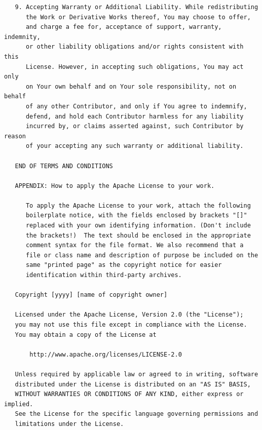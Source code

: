 \documentclass{book}
\begin{document}
\begin{verbatim}
   9. Accepting Warranty or Additional Liability. While redistributing
      the Work or Derivative Works thereof, You may choose to offer,
      and charge a fee for, acceptance of support, warranty, indemnity,
      or other liability obligations and/or rights consistent with this
      License. However, in accepting such obligations, You may act only
      on Your own behalf and on Your sole responsibility, not on behalf
      of any other Contributor, and only if You agree to indemnify,
      defend, and hold each Contributor harmless for any liability
      incurred by, or claims asserted against, such Contributor by reason
      of your accepting any such warranty or additional liability.

   END OF TERMS AND CONDITIONS

   APPENDIX: How to apply the Apache License to your work.

      To apply the Apache License to your work, attach the following
      boilerplate notice, with the fields enclosed by brackets "[]"
      replaced with your own identifying information. (Don't include
      the brackets!)  The text should be enclosed in the appropriate
      comment syntax for the file format. We also recommend that a
      file or class name and description of purpose be included on the
      same "printed page" as the copyright notice for easier
      identification within third-party archives.

   Copyright [yyyy] [name of copyright owner]

   Licensed under the Apache License, Version 2.0 (the "License");
   you may not use this file except in compliance with the License.
   You may obtain a copy of the License at

       http://www.apache.org/licenses/LICENSE-2.0

   Unless required by applicable law or agreed to in writing, software
   distributed under the License is distributed on an "AS IS" BASIS,
   WITHOUT WARRANTIES OR CONDITIONS OF ANY KIND, either express or implied.
   See the License for the specific language governing permissions and
   limitations under the License.

\end{verbatim}
\end{document}
